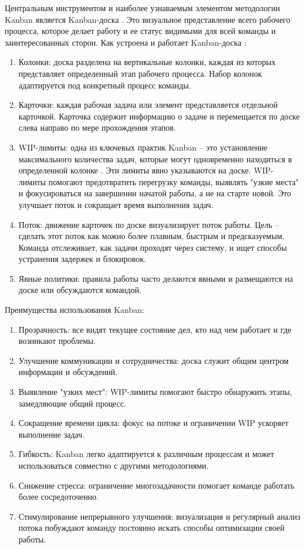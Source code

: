 Центральным инструментом и наиболее узнаваемым элементом методологии Kanban является Kanban-доска \cite{kanban2}. Это визуальное представление всего рабочего процесса, которое делает работу и ее статус видимыми для всей команды и заинтересованных сторон.
Как устроена и работает Kanban-доска \cite{kanban3}:
\begin{enumerate}
	\item Колонки: доска разделена на вертикальные колонки, каждая из которых представляет определенный этап рабочего процесса. Набор колонок адаптируется под конкретный процесс команды.
	\item Карточки: каждая рабочая задача или элемент представляется отдельной карточкой. Карточка содержит информацию о задаче и перемещается по доске слева направо по мере прохождения этапов.
	\item WIP-лимиты: одна из ключевых практик Kanban – это установление максимального количества задач, которые могут одновременно находиться в определенной колонке \cite{kanban1}. Эти лимиты явно указываются на доске. WIP-лимиты помогают предотвратить перегрузку команды, выявлять "узкие места" и фокусироваться на завершении начатой работы, а не на старте новой. Это улучшает поток и сокращает время выполнения задач.
	\item Поток: движение карточек по доске визуализирует поток работы. Цель – сделать этот поток как можно более плавным, быстрым и предсказуемым. Команда отслеживает, как задачи проходят через систему, и ищет способы устранения задержек и блокировок.
	\item Явные политики: правила работы часто делаются явными и размещаются на доске или обсуждаются командой.
\end{enumerate}

Преимущества использования Kanban:
\begin{enumerate}
	\item Прозрачность: все видят текущее состояние дел, кто над чем работает и где возникают проблемы.
	\item Улучшение коммуникации и сотрудничества: доска служит общим центром информации и обсуждений.
	\item Выявление "узких мест": WIP-лимиты помогают быстро обнаружить этапы, замедляющие общий процесс.
	\item Сокращение времени цикла: фокус на потоке и ограничении WIP ускоряет выполнение задач.
	\item Гибкость: Kanban легко адаптируется к различным процессам и может использоваться совместно с другими методологиями.
	\item Снижение стресса: ограничение многозадачности помогает команде работать более сосредоточенно.
	\item Стимулирование непрерывного улучшения: визуализация и регулярный анализ потока побуждают команду постоянно искать способы оптимизации своей работы.
\end{enumerate}

